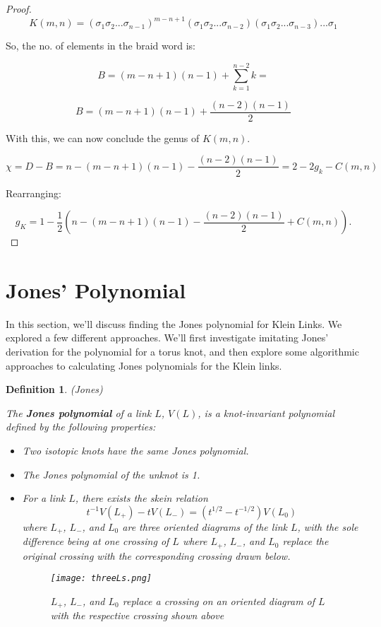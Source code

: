 \documentclass[12pt]{article}
\newtheorem{definition}{Definition}[section]
\begin{document}
\begin{proof}
$$
K(m, n) = (\sigma_1 \sigma_2... \sigma_{n-1})^{m-n+1}(\sigma_1 \sigma_2... \sigma_{n-2})(\sigma_1 \sigma_2... \sigma_{n-3})...\sigma_1
$$

So, the no. of elements in the braid word is:

$$
B = (m - n + 1)(n - 1) + \sum_{k = 1}^{n-2}k = 
$$

\begin{equation}
B = (m - n + 1)(n - 1) + \frac{(n-2)(n-1)}{2}
\end{equation}

With this, we can now conclude the genus of $K(m, n)$.

$$
\chi = D - B = n - (m - n + 1)(n-1) - \frac{(n-2)(n-1)}{2} = 2 - 2g_k - C(m, n)
$$

Rearranging:

$$
g_K = 1 - \frac{1}{2}\left(n - (m - n + 1)(n-1) - \frac{(n-2)(n-1)}{2} + C(m, n)\right).
$$

\end{proof}

\section{Jones' Polynomial}

In this section, we'll discuss finding the Jones polynomial for Klein Links. We explored a few different approaches. We'll first investigate imitating Jones' derivation for the polynomial for a torus knot, and then explore some algorithmic approaches to calculating Jones polynomials for the Klein links. 

\begin{definition} {(Jones)}

The \textbf{Jones polynomial} of a link $L$, $V(L)$, is a knot-invariant polynomial defined by the following properties: 

\begin{itemize}
\item Two isotopic knots have the same Jones polynomial.

\item The Jones polynomial of the unknot is 1. 

\item For a link $L$, there exists the skein relation $$t^{-1} V(L_+) - t V(L_-) = (t^{1/2} - t^{-1/2}) V(L_0)$$ where $L_+$, $L_-$, and $L_0$ are three oriented diagrams of the link $L$, with the sole difference being at one crossing of $L$ where $L_+$, $L_-$, and $L_0$ replace the original crossing with the corresponding crossing drawn below. 

\begin{figure}[H]
\centering
\texttt{[image: threeLs.png]}
\caption{\label{Jones Crossings} $L_+$, $L_-$, and $L_0$ replace a crossing on an oriented diagram of $L$ with the respective crossing shown above}
\end{figure}

\end{itemize}

\end{definition}
\end{document}
